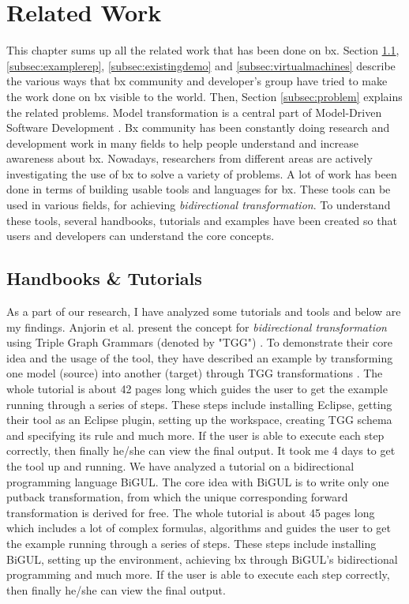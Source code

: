 \section{Related Work}\label{sec:relatedwork}
This chapter sums up all the related work that has been done on bx. Section \ref{subsec:handbook}, \ref{subsec:examplerep}, \ref{subsec:existingdemo} and \ref{subsec:virtualmachines} describe the various ways that bx community and developer's group have tried to make the work done on bx visible to the world. Then, Section \ref{subsec:problem} explains the related problems. 
\newline\newline Model transformation is a central part of Model-Driven Software Development \cite{bx-grace} \cite{bx-dagstuhl}. Bx community has been constantly doing research and development work in many fields to help people understand and increase awareness about bx. Nowadays, researchers from different areas are actively investigating the use of bx to solve a variety of problems. A lot of work has been done in terms of building usable tools and languages for bx. These tools can be used in various fields, for achieving \textit{bidirectional transformation}. To understand these tools, several handbooks, tutorials and examples have been created so that users and developers can understand the core concepts. 
\subsection{Handbooks \& Tutorials}\label{subsec:handbook}
As a part of our research, I have analyzed some tutorials and tools and below are my findings.
\newline\newline Anjorin et al.\cite{emoflon-part4} present the concept for \textit{bidirectional transformation} using Triple Graph Grammars (denoted by "TGG") \cite{tgg}. To demonstrate their core idea and the usage of the tool, they have described an example by transforming one model (source) into another (target) through TGG transformations \cite{tgg}\cite{bx-tgg}. The whole tutorial is about 42 pages long which guides the user to get the example running through a series of steps. These steps include installing \ac{Eclipse}, getting their tool as an Eclipse plugin, setting up the workspace, creating TGG schema and specifying its rule and much more. If the user is able to execute each step correctly, then finally he/she can view the final output. It took me 4 days to get the tool up and running.
\newline\newline We have analyzed a tutorial\cite{bigul-tutorial} on a bidirectional programming language BiGUL\cite{bigul}. The core idea with BiGUL is to write only one putback transformation, from which the unique corresponding forward transformation is derived for free. The whole tutorial is about 45 pages long which includes a lot of complex formulas, algorithms and guides the user to get the example running through a series of steps. These steps include installing BiGUL, setting up the environment, achieving bx through BiGUL's bidirectional programming and much more. If the user is able to execute each step correctly, then finally he/she can view the final output. 

